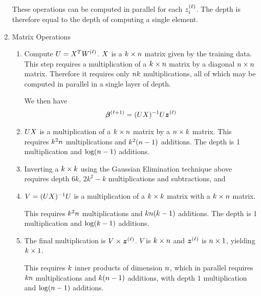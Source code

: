 \begin{enumerate}
	These operations can be computed in parallel for each $z^{(\ell)}_{i}$. The depth is therefore equal to the depth of computing a single element.
	
	\item Matrix Operations
	\begin{enumerate}
		\item 
		Compute $U = X^{T} W^{(\ell)}$. $X$ is a $k \times n$ matrix  given by the training data. 
		This step requires a multiplication of a $k \times n$ matrix by a diagonal $n \times n$ matrix.
		Therefore it requires only $n k$ multiplications, all of which may be computed in parallel in a single layer of depth.
	
		We then have 
		\begin{equation}
		\coefficients{\step+1} = \inversemat{(U\xdata)}U\updatevector{\step}
		\end{equation}

		\item $U X$ is a multiplication of a $k \times n$ matrix by a $n \times k$ matrix.
		This requires $k^{2}n$ multiplications and $k^{2}(n-1) $ additions. 
		The depth is 1 multiplication and $\log(n-1)$ additions.
	
		\item Inverting a $k \times k$ using the Gaussian Elimination technique above requires
		depth $6k$, $2k^{2} - k$ multiplications and subtractions, and 

		\item $V = (U X)^{-1}U$ is a multiplication of a $k \times k$ matrix with a $k \times n$ matrix. 
		
		This requires $k^{2}n$ multiplications and $kn(k-1)$ additions. The depth is 1 multiplication and $\log(k-1)$ additions.
	
	
		\item The final multiplication is $V \times \updatevector{\step}$.
		$V$ is $k \times n$ and $\updatevector{\step}$  is $n \times 1$, yielding $k \times 1$.
		
		This requires $k$ inner products of dimension $n$, which in parallel requires $kn$ multiplications and $k(n-1)$ additions, with depth $1$ multiplication and $\log(n-1)$ additions.
		

\end{enumerate}
\end{enumerate}
